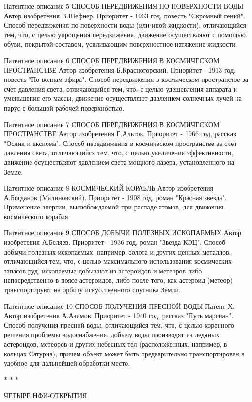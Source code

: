 \documentclass[11pt,a4paper]{article}
\begin{document}
Патентное описание 5
СПОСОБ ПЕРЕДВИЖЕНИЯ ПО ПОВЕРХНОСТИ ВОДЫ
Автор изобретения В.Шефнер. Приоритет - 1963 год, повесть "Скромный гений".
Способ передвижения по поверхности воды (или иной жидкости), отличающийся тем, что, с целью упрощения передвижения, движение осуществляют с помощью обуви, покрытой составом, усиливающим поверхностное натяжение жидкости.

Патентное описание 6
СПОСОБ ПЕРЕДВИЖЕНИЯ В КОСМИЧЕСКОМ ПРОСТРАНСТВЕ
Автор изобретения Б.Красногорский. Приоритет - 1913 год, повесть "По волнам эфира".
Способ передвижения в космическом пространстве за счет давления света, отличающийся тем, что, с целью удешевления аппарата и уменьшения его массы, движение осуществляют давлением солнечных лучей на парус с большой рабочей поверхностью.

Патентное описание 7
СПОСОБ ПЕРЕДВИЖЕНИЯ В КОСМИЧЕСКОМ ПРОСТРАНСТВЕ
Автор изобретения Г.Альтов. Приоритет - 1966 год, рассказ "Ослик и аксиома".
Способ передвижения в космическом пространстве за счет давления света, отличающийся тем, что, с целью увеличения эффективности, движение осуществляют давлением света мощного лазера, установленного на Земле.

Патентное описание 8
КОСМИЧЕСКИЙ КОРАБЛЬ
Автор изобретения А.Богданов (Малиновский). Приоритет - 1908 год, роман "Красная звезда".
Применение энергии, высвобождаемой при распаде атомов, для движения космического корабля.

Патентное описание 9
СПОСОБ ДОБЫЧИ ПОЛЕЗНЫХ ИСКОПАЕМЫХ
Автор изобретения А.Беляев. Приоритет - 1936 год, роман "Звезда КЭЦ".
Способ добычи полезных ископаемых, например, золота и других ценных металлов, отличающийся тем, что, с целью максимального использования космических запасов руд, ископаемые добывают из астероидов и метеоров либо непосредственно в поясе астероидов, либо после того, как астероид (метеор) транспортируют на орбиту искусственного спутника Земли.

Патентное описание 10
СПОСОБ ПОЛУЧЕНИЯ ПРЕСНОЙ ВОДЫ
Патент Х. Автор изобретения А.Азимов. Приоритет - 1940 год, рассказ "Путь марсиан".
Способ получения пресной воды, отличающийся тем, что, с целью коренного решения проблемы водоснабжения, добычу воды производят из ледяных астероидов, метеоров и других небесных тел (расположенных, например, в кольцах Сатурна), причем объект может быть предварительно транспортирован в удобное для дальнейшей обработки место.

* * *

ЧЕТЫРЕ НФИ-ОТКРЫТИЯ
\end{document}
